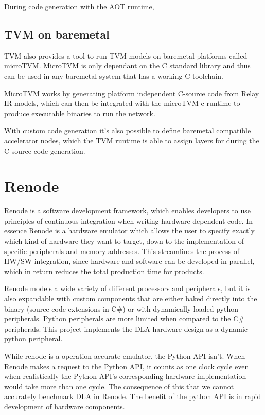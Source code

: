 \documentclass[12pt,a4paper,english
]{tunithesis}
\begin{document}
During code generation with the AOT runtime,


\subsection{TVM on baremetal}
TVM also provides a tool to run TVM models on baremetal platforms called microTVM. MicroTVM is only dependant on the C standard library and thus can be used in any baremetal system that has a working C-toolchain.

MicroTVM works by generating platform independent C-source code from Relay IR-models, which can then be integrated with the microTVM c-runtime to produce executable binaries to run the network.

With custom code generation it's also possible to define baremetal compatible accelerator nodes, which the TVM runtime is able to assign layers for during the C source code generation.~\parencite{TVM}


\section{Renode}
\label{sec:renode}
Renode is a software development framework, which enables developers to use principles of continuous integration when writing hardware dependent code. In essence Renode is a hardware emulator which allows the user to specify exactly which kind of hardware they want to target, down to the implementation of specific peripherals and memory addresses. This streamlines the process of HW/SW integration, since hardware and software can be developed in parallel, which in return reduces the total production time for products.

Renode models a wide variety of different processors and peripherals, but it is also expandable with custom components that are either baked directly into the binary (source code extensions in C\#) or with dynamically loaded python peripherals. Python peripherals are more limited when compared to the C\# peripherals. This project implements the DLA hardware design as a dynamic python peripheral.

While renode is a operation accurate emulator, the Python API isn't. When Renode makes a request to the Python API, it counts as one clock cycle even when realistically the Python API's corresponding hardware implementation would take more than one cycle. The consequence of this that we cannot accurately benchmark DLA in Renode. The benefit of the python API is in rapid development of hardware components.
\end{document}
